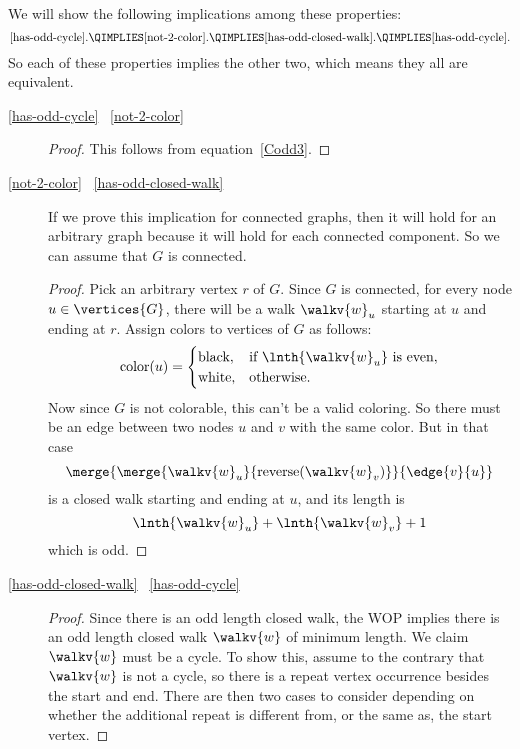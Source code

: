 We will show the following implications among these properties:
\[
\text{\ref{has-odd-cycle}.} \QIMPLIES \text{\ref{not-2-color}.} \QIMPLIES
\text{\ref{has-odd-closed-walk}.} \QIMPLIES
\text{\ref{has-odd-cycle}}.
\]
So each of these properties implies the other two, which means they
all are equivalent.
\iffalse
\footnote{Mutual implication follows from transivity of implication,
  Rule~\ref{rule:transitivity} in Section~\ref{sec:logical_deduction}}
\fi

\begin{description}

\item[\ref{has-odd-cycle} \QIMPLIES\ \ref{not-2-color}]
\begin{proof}
This follows from equation~\ref{Codd3}.
\end{proof}

\item[\ref{not-2-color} \QIMPLIES\ \ref{has-odd-closed-walk}]

  If we prove this implication for connected graphs, then it will hold
  for an arbitrary graph because it will hold for each
  connected component.  So we can assume that $G$ is connected.
\begin{proof}

  Pick an arbitrary vertex $r$ of $G$.  Since $G$ is connected, for every
  node $u \in \vertices{G}$, there will be a walk $\walkv{w}_u$ starting
  at $u$ and ending at $r$.  Assign colors to vertices of $G$ as follows:
\[
\text{color}(u) = \begin{cases}
                   \text{black}, & \text{if $\lnth{\walkv{w}_u}$ is even},\\
                   \text{white}, & \text{otherwise}.
\end{cases}
\]
Now since $G$ is not colorable, this can't be a valid coloring.  So there
must be an edge between two nodes $u$ and $v$ with the same color.  But in
that case
\[
\merge{\merge{\walkv{w}_u}{\text{reverse}(\walkv{w}_v)}}{\edge{v}{u}}
\]
is a closed walk starting and ending at $u$, and its length is
\[
\lnth{\walkv{w}_u} + \lnth{\walkv{w}_v} + 1
\]
which is odd.
\end{proof}

\item[\ref{has-odd-closed-walk} \QIMPLIES\ \ref{has-odd-cycle}]

\begin{proof}
  Since there is an odd length closed walk, the WOP implies there is an odd
  length closed walk $\walkv{w}$ of minimum length.  We claim $\walkv{w}$
  must be a cycle.  To show this, assume to the contrary that
  $\walkv{w}$ is not a cycle, so there is a repeat vertex occurrence
  besides the start and end.   There are then two cases to consider depending on
whether the additional repeat is different from, or the same as, the
start vertex.


\end{proof}
\end{description}
